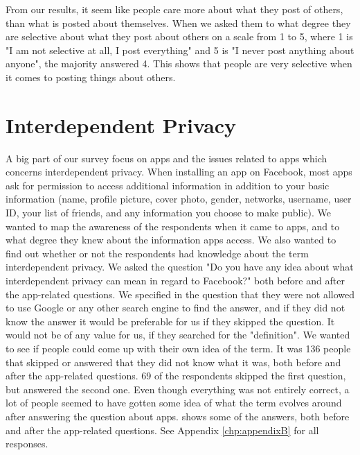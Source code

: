 From our results, it seem like people care more about what they post of others, than what is posted about themselves. When we asked them to what degree they are selective about what they post about others on a scale from 1 to 5, where 1 is "I am not selective at all, I post everything" and 5 is "I never post anything about anyone", the majority answered 4. This shows that people are very selective when it comes to posting things about others.

\section{Interdependent Privacy}

A big part of our survey focus on apps and the issues related to apps which concerns interdependent privacy. When installing an app on Facebook, most apps ask for permission to access additional information in addition to your basic information (name, profile picture, cover photo, gender, networks, username, user ID, your list of friends, and any information you choose to make public). We wanted to map the awareness of the respondents when it came to apps, and to what degree they knew about the information apps access. We also wanted to find out whether or not the respondents had knowledge about the term interdependent privacy. We asked the question "Do you have any idea about what interdependent privacy can mean in regard to Facebook?" both before and after the app-related questions. We specified in the question that they were not allowed to use Google or any other search engine to find the answer, and if they did not know the answer it would be preferable for us if they skipped the question. It would not be of any value for us, if they searched for the "definition". We wanted to see if people could come up with their own idea of the term. It was 136 people that skipped or answered that they did not know what it was, both before and after the app-related questions. 69 of the respondents skipped the first question, but answered the second one. Even though everything was not entirely correct, a lot of people seemed to have gotten some idea of what the term evolves around after answering the question about apps.  shows some of the answers, both before and after the app-related questions. See Appendix \ref{chp:appendixB} for all responses.   


